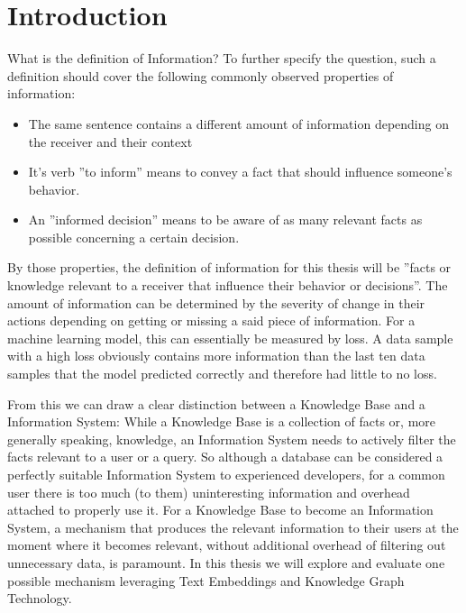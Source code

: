 \documentclass[draft,final]{vutinfth} %
\begin{document}

\tableofcontents %

\mainmatter

\chapter{Introduction}

What is the definition of Information? To further specify the question, such a definition should cover the following commonly observed properties of information:
\begin{itemize}
    \item The same sentence contains a different amount of information depending on the receiver and their context
    \item It's verb ''to inform'' means to convey a fact that should influence someone's behavior.
    \item An ''informed decision'' means to be aware of as many relevant facts as possible concerning a certain decision.
\end{itemize} 
By those properties, the definition of information for this thesis will be ''facts or knowledge relevant to a receiver that influence their behavior or decisions''. The amount of information can be determined by the severity of change in their actions depending on getting or missing a said piece of information. For a machine learning model, this can essentially be measured by loss. A data sample with a high loss obviously contains more information than the last ten data samples that the model predicted correctly and therefore had little to no loss. 

From this we can draw a clear distinction between a Knowledge Base and a Information System: While a Knowledge Base is a collection of facts or, more generally speaking, knowledge, an Information System needs to actively filter the facts relevant to a user or a query.
So although a database can be considered a perfectly suitable Information System to experienced developers, for a common user there is too much (to them) uninteresting information and overhead attached to properly use it. 
For a Knowledge Base to become an Information System, a mechanism that produces the relevant information to their users at the moment where it becomes relevant, without additional overhead of filtering out unnecessary data, is paramount. In this thesis we will explore and evaluate one possible mechanism leveraging Text Embeddings and Knowledge Graph Technology.
\end{document}

